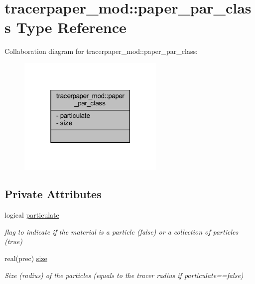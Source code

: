 \hypertarget{structtracerpaper__mod_1_1paper__par__class}{}\section{tracerpaper\+\_\+mod\+:\+:paper\+\_\+par\+\_\+class Type Reference}
\label{structtracerpaper__mod_1_1paper__par__class}


Collaboration diagram for tracerpaper\+\_\+mod\+:\+:paper\+\_\+par\+\_\+class\+:\nopagebreak
\begin{figure}[H]
\begin{center}
\leavevmode
\includegraphics[width=199pt]{structtracerpaper__mod_1_1paper__par__class__coll__graph}
\end{center}
\end{figure}
\subsection*{Private Attributes}
\begin{DoxyCompactItemize}
\item 
logical \mbox{\hyperlink{structtracerpaper__mod_1_1paper__par__class_a3b237f726cdf3f35fa122047d0175351}{particulate}}
\begin{DoxyCompactList}\small\item\em flag to indicate if the material is a particle (false) or a collection of particles (true) \end{DoxyCompactList}\item 
real(prec) \mbox{\hyperlink{structtracerpaper__mod_1_1paper__par__class_a25325a2f6e0e3a16e1a2abffe5d0f6c8}{size}}
\begin{DoxyCompactList}\small\item\em Size (radius) of the particles (equals to the tracer radius if particulate==false) \end{DoxyCompactList}\end{DoxyCompactItemize}


